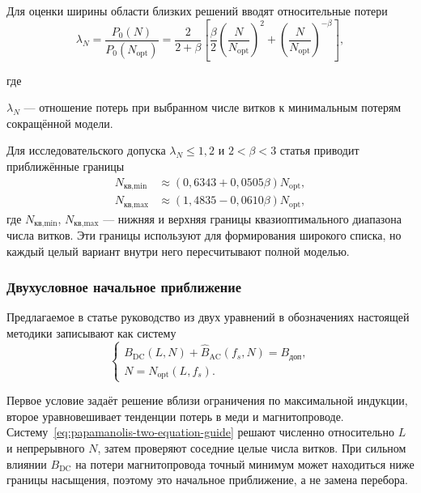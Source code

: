 \documentclass[14pt,a4paper]{extarticle}
\newenvironment{whereblock}
 {\par\noindent где\par
  \begin{list}{}{\setlength{\leftmargin}{12.5mm}
                  \setlength{\itemindent}{-12.5mm}
                  \setlength{\itemsep}{0pt}
                  \setlength{\parsep}{0pt}
                  \setlength{\topsep}{0pt}}}
 {\end{list}}
\newcommand{\whereitem}[2]{\item[] #1 --- #2}
\begin{document}
Для оценки ширины области близких решений вводят относительные потери
\begin{equation}
 \lambda_N=
 \frac{P_0(N)}{P_0(N_{\text{opt}})}
 =
 \frac{2}{2+\beta}
 \left[
 \frac{\beta}{2}
 \left(\frac{N}{N_{\text{opt}}}\right)^2+
 \left(\frac{N}{N_{\text{opt}}}\right)^{-\beta}
 \right],
 \label{eq:papamanolis-flat-turns}
\end{equation}
\begin{whereblock}
\whereitem{$\lambda_N$}{отношение потерь при выбранном числе витков к
минимальным потерям сокращённой модели.}
\end{whereblock}

Для исследовательского допуска $\lambda_N\leq1{,}2$ и
$2<\beta<3$ статья приводит приближённые границы
\begin{align}
 N_{\text{кв,min}}&\approx
 (0{,}6343+0{,}0505\beta)N_{\text{opt}},
 \label{eq:papamanolis-nq-min}\\
 N_{\text{кв,max}}&\approx
 (1{,}4835-0{,}0610\beta)N_{\text{opt}},
 \label{eq:papamanolis-nq-max}
\end{align}
где $N_{\text{кв,min}}$, $N_{\text{кв,max}}$ --- нижняя и верхняя
границы квазиоптимального диапазона числа витков. Эти границы используют
для формирования широкого списка, но каждый целый вариант внутри него
пересчитывают полной моделью.

\subsubsection{Двухусловное начальное приближение}

Предлагаемое в статье руководство из двух уравнений в обозначениях
настоящей методики записывают как систему
\begin{equation}
 \begin{cases}
 B_{\text{DC}}(L,N)+\widehat B_{\text{AC}}(f_s,N)
 =B_{\text{доп}},\\
 N=N_{\text{opt}}(L,f_s).
 \end{cases}
 \label{eq:papamanolis-two-equation-guide}
\end{equation}

Первое условие задаёт решение вблизи ограничения по максимальной
индукции, второе уравновешивает тенденции потерь в меди и
магнитопроводе. Систему~\eqref{eq:papamanolis-two-equation-guide} решают
численно относительно $L$ и непрерывного $N$, затем проверяют соседние
целые числа витков. При сильном влиянии $B_{\text{DC}}$ на потери
магнитопровода точный минимум может находиться ниже границы насыщения,
поэтому это начальное приближение, а не замена перебора.
\end{document}
